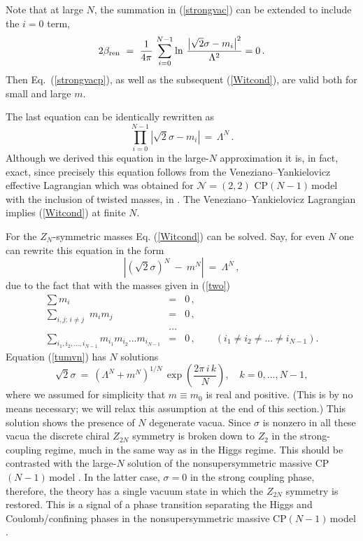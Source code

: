 \documentclass[epsfig,12pt]{article}
\def\beq{\begin{equation}}
\def\eeq{\end{equation}}
\def\beqn{\begin{eqnarray}}
\def\eeqn{\end{eqnarray}}
\newcommand{\cpn}{CP$(N-1)\,$}
\newcommand{\zn}{$Z_N$}
\def\beqn{\begin{eqnarray}}
\def\eeqn{\end{eqnarray}}
\def\beq{\begin{equation}}
\def\eeq{\end{equation}}
\newcommand{\ntwot}{${\mathcal N}= \left(2,2\right) $ }
\begin{document}
 Note that at large $N$, the summation in (\ref{strongvac}) can be extended to include the
 $i=0$ term,
 \beq
 2\beta_{\rm ren}~=~\frac{1}{4\pi}\, 
\sum_{i=0}^{N-1}\ln\, {\frac{\bigl|\sqrt{2}\sigma-m_i\bigr|^2}{\Lambda^2}}=0 \,.
\label{strongvacp}
 \eeq
 Then Eq.~(\ref{strongvacp}), as well as 
 the subsequent (\ref{Witcond}), are valid both for small and large $m$.

The last equation can be identically rewritten as 
\beq
\prod_{i=0}^{N-1}\left|\sqrt{2}\sigma-m_i\right| \,=\,\Lambda^N \,.
\label{Witcond}
\eeq
Although we derived this equation in the large-$N$ approximation it is, in fact,
exact, since precisely this equation follows from the
Veneziano--Yankielovicz effective Lagrangian which was obtained for \ntwot \cpn model with the inclusion of twisted masses, 
in  \cite{AdDVecSal,ChVa,W93,HaHo,Dor}. The Veneziano--Yankielovicz  Lagrangian implies (\ref{Witcond})
at finite $N$.

For the \zn-symmetric masses
Eq. (\ref{Witcond}) can be solved. Say, for even $N$ one can rewrite this equation in the form
\beq
\left|\left(\sqrt{2}\sigma\right)^N ~-~ m^N\right| ~=~ \Lambda^N \,,
\label{tumvn}
\eeq
due to the fact that with the masses given in (\ref{two})
\beqn
\sum m_i &=& 0\,,
\nonumber\\[2mm]
\sum_{i,j;\,i\neq j}\,\, m_i m_j &=& 0\,,
\nonumber\\[2mm]
&...&
\nonumber\\[2mm]
\sum_{i_1,i_2,...,i_{N-1}} m_{i_1} m_{i_2} ... m_{i_{N-1}} &=& 0\,,\qquad \left(i_1\neq i_2\neq ...\neq i_{N-1}\right).
\eeqn
Equation (\ref{tumvn})  has $N$ solutions
\beq
\sqrt{2}\sigma ~=~ \left(\Lambda^N+m^N\right)^{1/N}\,
\exp\left( \frac{2\pi\,i\, k}{N}
\right), \quad k=0, ..., N-1,
\label{22sigma}
\eeq
where we assumed for simplicity that $m\equiv m_0$ is real and positive.
(This is by no means necessary; we will relax this assumption at the end of this section.)
This solution shows the presence of $N$ degenerate vacua. Since $\sigma$ is nonzero in all these vacua
the discrete chiral $Z_{2N}$ symmetry is broken down to $Z_2$ in the strong-coupling regime, much in the same way as
in the Higgs regime. This should be contrasted with the large-$N$ solution of the nonsupersymmetric
massive \cpn model \cite{GSYphtr}. In the latter case, $\sigma=0$ in the strong coupling phase, 
therefore, the theory
has   a single vacuum state in which the $Z_{2N}$ symmetry is restored. This is a signal of a phase transition
separating the Higgs and Coulomb/confining phases in the nonsupersymmetric massive \cpn model \cite{GSYphtr}.
\end{document}

